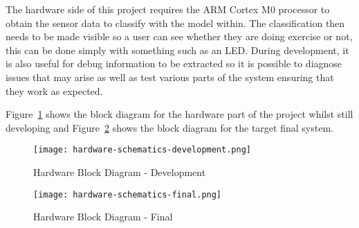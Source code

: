 
The hardware side of this project requires the ARM Cortex M0 processor to obtain the sensor data to classify with the model within. The classification then needs to be made visible so a user can see whether they are doing exercise or not, this can be done simply with something such as an LED. During development, it is also useful for debug information to be extracted so it is possible to diagnose issues that may arise as well as test various parts of the system ensuring that they work as expected. 

Figure~\ref{fig:hardware_schematic_development} shows the block diagram for the hardware part of the project whilst still developing and Figure~\ref{fig:hardware_schematic_final} shows the block diagram for the target final system.

\begin{figure}
	\centering
	\texttt{[image: hardware-schematics-development.png]}
	\caption{Hardware Block Diagram - Development}
	\label{fig:hardware_schematic_development}
\end{figure}

\begin{figure}
	\centering
	\texttt{[image: hardware-schematics-final.png]}
	\caption{Hardware Block Diagram - Final}
	\label{fig:hardware_schematic_final}
\end{figure}